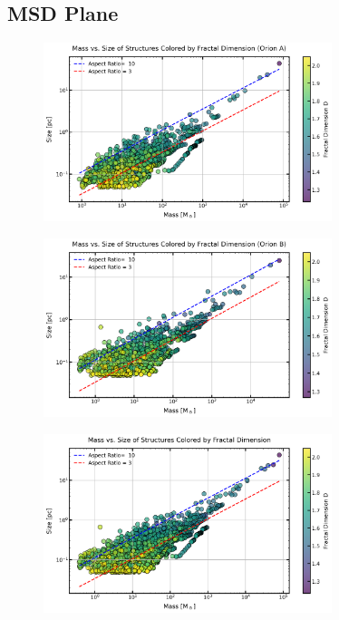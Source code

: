 \subsection{MSD Plane}

\begin{figure}[t]
    \centering
    \includegraphics[width=0.75\textwidth]{figures/MSD_Orion_A.png}
    \caption{}
    \label{fig:MSD_orion_A}
\end{figure}

\begin{figure}[t]
    \centering
    \includegraphics[width=0.75\textwidth]{figures/MSD_Orion_B.png}
    \caption{}
    \label{fig:MSD_orion_B}
\end{figure}

\begin{figure}[t]
    \centering
    \includegraphics[width=0.75\textwidth]{figures/MSD_Orion_A_B.png}
    \caption{}
    \label{fig:MSD_orion_A_B}
\end{figure}

